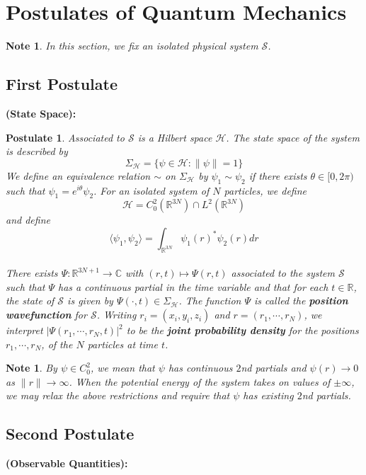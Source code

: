 \documentclass[12pt]{amsart}
\newtheorem{pos}{Postulate}
\newtheorem{note}[thm]{Note}
\renewcommand{\r}{\rangle}
\renewcommand{\l}{\langle}
\newcommand{\Sig}{\Sigma}
\newcommand{\C}{\mathbb{C}}
\newcommand{\R}{\mathbb{R}}
\newcommand{\MS}{\mathcal{S}}
\newcommand{\MH}{\mathcal{H}}
\begin{document}
\newpage 

\section{Postulates of Quantum Mechanics}

\begin{note}
	In this section, we fix an isolated physical system $\MS$.
\end{note}

\subsection{First Postulate}\textbf{(State Space):}
\begin{pos}
	Associated to $\MS$ is a Hilbert space $\MH$. The state space of the system is described by $$\Sigma_{\MH} = \{\psi \in \MH: \|\psi\| = 1\}$$ We define an equivalence relation $\sim$ on $\Sig_{\MH}$ by $\psi_1 \sim \psi_2$ if there exists $\theta \in [0, 2\pi)$ such that $\psi_1 = e^{i \theta} \psi_2$. For an isolated system of $N$ particles, we define $$\MH = C^2_{0}(\R^{3N}) \cap L^2(\R^{3N}) $$ and define $$\l \psi_1, \psi_2 \r = \int_{\R^{3N}} \psi_1(r)^* \psi_2(r) dr$$  \hspace{.5cm}\\
	There exists $\Psi: \R^{3N +1} \rightarrow \C$ with $(r, t) \mapsto \Psi(r,t)$ associated to the system $\MS$ such that $\Psi$ has a continuous partial in the time variable and that for each $t \in \R$, the state of $\MS$ is given by $\Psi(\cdot, t) \in \Sig_{\MH}$. The function $\Psi$ is called the \textbf{position wavefunction} for $\MS$. Writing $r_i = (x_i, y_i, z_i)$ and $r = (r_1, \cdots, r_N)$, we interpret $|\Psi(r_1, \cdots, r_N,t)|^2$ to be the \textbf{joint probability density} for the positions $r_1, \cdots, r_N$, of the $N$ particles at time $t$. \\
\end{pos}

\begin{note}
	By $\psi \in C^2_0$, we mean that $\psi$ has continuous $2$nd partials and $\psi(r) \rightarrow 0$ as $\|r\| \rightarrow \infty$. When the potential energy of the system takes on values of $\pm \infty$, we may relax the above restrictions and require that $\psi$ has existing $2$nd partials. 
\end{note}

\subsection{Second Postulate}\textbf{(Observable Quantities):}
\end{document}
